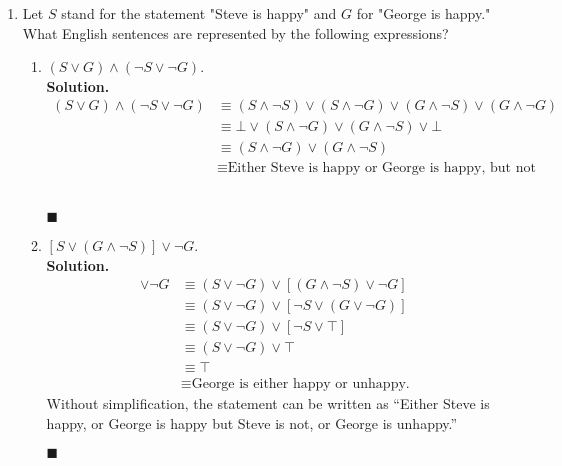 \documentclass{report}
\newcommand{\sol}{\vspace{1em}\\\textbf{Solution.}\vspace{0.5em}}
\newcommand{\qed}{\ \\\strut\hfill$\blacksquare$\vspace{1em}}
\begin{document}
\begin{enumerate}[leftmargin=*]
\begin{enumerate}
                  \item $\neg P \vee \neg S$.
                        \sol{}

                        Either I will not buy the pants or I will not buy the shirt. \qed
            \end{enumerate}

      \item Let $S$ stand for the statement "Steve is happy" and $G$ for "George is happy."
            What English sentences are represented by the following expressions?
            \begin{enumerate}
                  \item $(S \vee G) \wedge(\neg S \vee \neg G)$. \sol{}
                        \begin{align*}
                              (S \vee G) \wedge(\neg S \vee \neg G) & \equiv (S \wedge \neg S) \vee (S \wedge \neg G) \vee (G \wedge \neg S) \vee (G \wedge \neg G) \\
                                                                    & \equiv \bot \vee (S \wedge \neg G) \vee (G \wedge \neg S) \vee \bot                           \\
                                                                    & \equiv (S \wedge \neg G) \vee (G \wedge \neg S)                                               \\
                                                                    & \equiv \text{Either Steve is happy or George is happy, but not both.}
                        \end{align*} \qed

                  \item $[S \vee(G \wedge \neg S)] \vee \neg G$. \sol{}
                        \begin{align*}
                              [S \vee(G \wedge \neg S)] \vee \neg G & \equiv (S \vee \neg G) \vee [(G \wedge \neg S) \vee \neg G] \\
                                                                    & \equiv (S \vee \neg G) \vee [\neg S \vee (G \vee \neg G)]   \\
                                                                    & \equiv (S \vee \neg G) \vee [\neg S \vee \top]              \\
                                                                    & \equiv (S \vee \neg G) \vee \top                            \\
                                                                    & \equiv \top                                                 \\
                                                                    & \equiv \text{George is either happy or unhappy.}
                        \end{align*}
                        Without simplification, the statement can be written as ``Either Steve is happy, or George is happy but Steve is not, or George is unhappy.'' \qed


\end{enumerate}
\end{enumerate}
\end{document}
